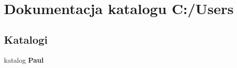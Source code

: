 \section{Dokumentacja katalogu C\+:/\+Users}
\label{dir_8ceffd4ee35c3518d4e8bdc7e638efe8}
\subsection*{Katalogi}
\begin{DoxyCompactItemize}
\item 
katalog {\bf Paul}
\end{DoxyCompactItemize}
